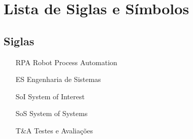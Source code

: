 
\newpage
\chapter*{Lista de Siglas e Símbolos} %

	\section*{Siglas}
	
		\begin{itemize}[labelwidth=5em,leftmargin=\dimexpr{}+\relax,align=left]
			\item[RPA] Robot Process Automation
			\item[ES] Engenharia de Sistemas
			\item[SoI] System of Interest
			\item[SoS] System of Systems
			\item[T\&A] Testes e Avaliações
		\end{itemize}
	
		\thispagestyle{empty}

	
	
	
	
	